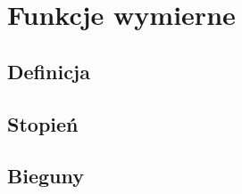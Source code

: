 \section{Funkcje wymierne}

\subsection*{Definicja}


\subsection*{Stopień}


\subsection*{Bieguny}

